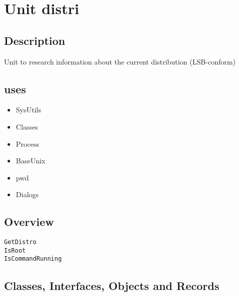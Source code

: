 \documentclass{report}
\newif\ifpdf
\begin{document}
\chapter{Unit distri}
\label{distri}
\section{Description}
Unit to research information about the current distribution (LSB{-}conform)
\section{uses}
\begin{itemize}
\item \begin{ttfamily}SysUtils\end{ttfamily}\item \begin{ttfamily}Classes\end{ttfamily}\item \begin{ttfamily}Process\end{ttfamily}\item \begin{ttfamily}BaseUnix\end{ttfamily}\item \begin{ttfamily}pwd\end{ttfamily}\item \begin{ttfamily}Dialogs\end{ttfamily}\end{itemize}
\section{Overview}
\begin{description}
\item[\texttt{\begin{ttfamily}TDistroInfo\end{ttfamily} record}]
\end{description}
\begin{description}
\item[\texttt{GetDistro}]
\item[\texttt{IsRoot}]
\item[\texttt{IsCommandRunning}]
\end{description}
\section{Classes, Interfaces, Objects and Records}
\ifpdf
\end{document}
